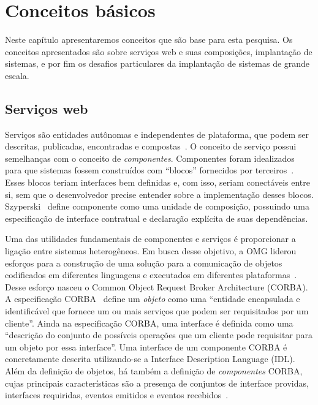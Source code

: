 \chapter{Conceitos básicos}
\label{cap:conceitos}

Neste capítulo apresentaremos conceitos que são base para esta pesquisa.
Os conceitos apresentados são sobre serviços web e suas composições, 
implantação de sistemas, e por fim os desafios particulares da implantação
de sistemas de grande escala.

\section{Serviços web}
\label{sec:servicos}

Serviços são entidades autônomas e independentes de plataforma, que podem ser descritas, publicadas, encontradas e compostas~\cite{Papazoglou2007State}. O conceito de serviço possui semelhanças com o conceito de \emph{componentes}. Componentes foram idealizados para que sistemas fossem construídos com ``blocos'' fornecidos por terceiros~\cite{McIlroy1968MassProduced}. Esses blocos teriam interfaces bem definidas e, com isso, seriam conectáveis entre si, sem que o desenvolvedor precise entender sobre a implementação desses blocos. Szyperski~\cite{Szyperski2003Component} define componente como uma unidade de composição, possuindo uma especificação de interface contratual e declaração explícita de suas dependências. 

Uma das utilidades fundamentais de componentes e serviços é proporcionar a ligação entre sistemas heterogêneos.
Em busca desse objetivo, a OMG liderou esforços para a construção de uma solução para a comunicação de objetos
codificados em diferentes linguagens e executados em diferentes plataformas~\cite{Szyperski2002Components}.
Desse esforço nasceu o Common Object Request Broker Architecture (CORBA).
A especificação CORBA~\cite{CORBA1995} define um \emph{objeto} como uma ``entidade encapsulada e identificável que fornece um ou mais serviços que podem ser requisitados por um cliente''. Ainda na especificação CORBA, uma interface é definida como uma ``descrição do conjunto de possíveis operações que um cliente pode requisitar para um objeto por essa interface''. Uma interface de um componente CORBA é concretamente descrita utilizando-se a Interface Description Language (IDL). 
Além da definição de objetos, há também a definição de \emph{componentes} CORBA, cujas principais características são 
a presença de conjuntos de interface providas, interfaces requiridas, eventos emitidos e eventos recebidos~\cite{Szyperski2002Components}.

